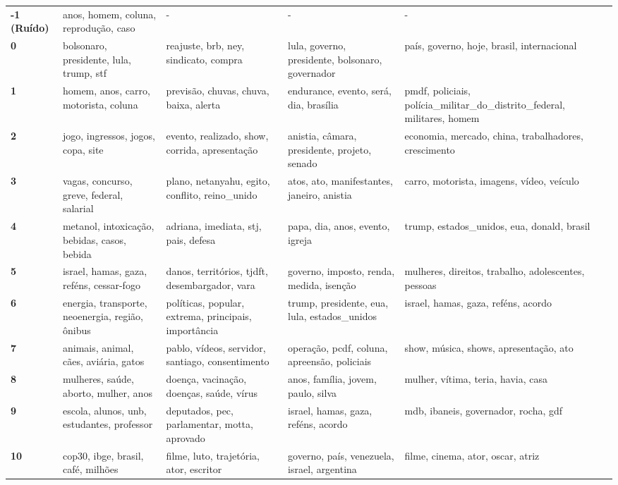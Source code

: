 \begin{xltabular}{\textwidth}{@{}l >{\RaggedRight\arraybackslash}X >{\RaggedRight\arraybackslash}X >{\RaggedRight\arraybackslash}X >{\RaggedRight\arraybackslash}X@{}}
    \textbf{-1 (Ruído)} & anos, homem, coluna, reprodução, caso & - & - & - \\
    \textbf{0} & bolsonaro, presidente, lula, trump, stf & reajuste, brb, ney, sindicato, compra & lula, governo, presidente, bolsonaro, governador & país, governo, hoje, brasil, internacional \\
    \textbf{1} & homem, anos, carro, motorista, coluna & previsão, chuvas, chuva, baixa, alerta & endurance, evento, será, dia, brasília & pmdf, policiais, polícia\_militar\_do\_distrito\_federal, militares, homem \\
    \textbf{2} & jogo, ingressos, jogos, copa, site & evento, realizado, show, corrida, apresentação & anistia, câmara, presidente, projeto, senado & economia, mercado, china, trabalhadores, crescimento \\
    \textbf{3} & vagas, concurso, greve, federal, salarial & plano, netanyahu, egito, conflito, reino\_unido & atos, ato, manifestantes, janeiro, anistia & carro, motorista, imagens, vídeo, veículo \\
    \textbf{4} & metanol, intoxicação, bebidas, casos, bebida & adriana, imediata, stj, pais, defesa & papa, dia, anos, evento, igreja & trump, estados\_unidos, eua, donald, brasil \\
    \textbf{5} & israel, hamas, gaza, reféns, cessar-fogo & danos, territórios, tjdft, desembargador, vara & governo, imposto, renda, medida, isenção & mulheres, direitos, trabalho, adolescentes, pessoas \\
    \textbf{6} & energia, transporte, neoenergia, região, ônibus & políticas, popular, extrema, principais, importância & trump, presidente, eua, lula, estados\_unidos & israel, hamas, gaza, reféns, acordo \\
    \textbf{7} & animais, animal, cães, aviária, gatos & pablo, vídeos, servidor, santiago, consentimento & operação, pcdf, coluna, apreensão, policiais & show, música, shows, apresentação, ato \\
    \textbf{8} & mulheres, saúde, aborto, mulher, anos & doença, vacinação, doenças, saúde, vírus & anos, família, jovem, paulo, silva & mulher, vítima, teria, havia, casa \\
    \textbf{9} & escola, alunos, unb, estudantes, professor & deputados, pec, parlamentar, motta, aprovado & israel, hamas, gaza, reféns, acordo & mdb, ibaneis, governador, rocha, gdf \\
    \textbf{10} & cop30, ibge, brasil, café, milhões & filme, luto, trajetória, ator, escritor & governo, país, venezuela, israel, argentina & filme, cinema, ator, oscar, atriz \\

\end{xltabular}
